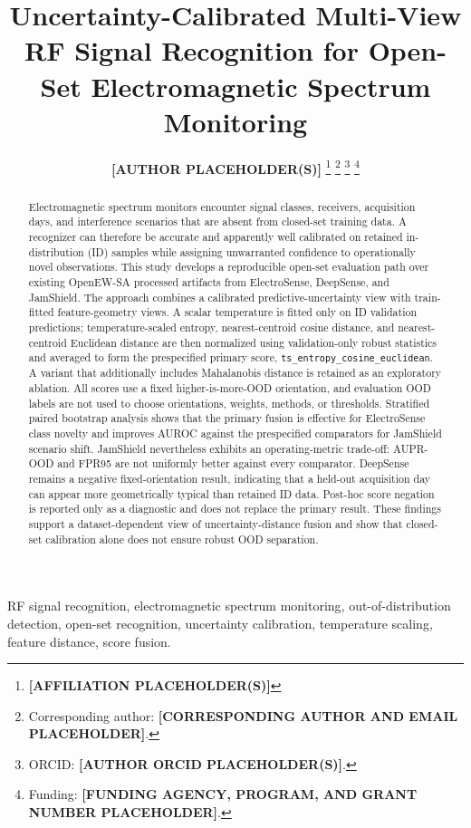 \documentclass[journal]{IEEEtran}
\title{Uncertainty-Calibrated Multi-View RF Signal Recognition for Open-Set Electromagnetic Spectrum Monitoring}
\author{%
  \textbf{[AUTHOR PLACEHOLDER(S)]}%
  \thanks{\textbf{[AFFILIATION PLACEHOLDER(S)]}}%
  \thanks{Corresponding author: \textbf{[CORRESPONDING AUTHOR AND EMAIL PLACEHOLDER]}.}%
  \thanks{ORCID: \textbf{[AUTHOR ORCID PLACEHOLDER(S)]}.}%
  \thanks{Funding: \textbf{[FUNDING AGENCY, PROGRAM, AND GRANT NUMBER PLACEHOLDER]}.}%
}
\newcommand{\primarymethod}{{\footnotesize\texttt{ts\_\allowbreak entropy\_\allowbreak cosine\_\allowbreak euclidean}}}
\begin{document}
\maketitle

\begin{abstract}
Electromagnetic spectrum monitors encounter signal classes, receivers, acquisition days, and interference scenarios that are absent from closed-set training data. A recognizer can therefore be accurate and apparently well calibrated on retained in-distribution (ID) samples while assigning unwarranted confidence to operationally novel observations. This study develops a reproducible open-set evaluation path over existing OpenEW-SA processed artifacts from ElectroSense, DeepSense, and JamShield. The approach combines a calibrated predictive-uncertainty view with train-fitted feature-geometry views. A scalar temperature is fitted only on ID validation predictions; temperature-scaled entropy, nearest-centroid cosine distance, and nearest-centroid Euclidean distance are then normalized using validation-only robust statistics and averaged to form the prespecified primary score, \primarymethod. A variant that additionally includes Mahalanobis distance is retained as an exploratory ablation. All scores use a fixed higher-is-more-OOD orientation, and evaluation OOD labels are not used to choose orientations, weights, methods, or thresholds. Stratified paired bootstrap analysis shows that the primary fusion is effective for ElectroSense class novelty and improves AUROC against the prespecified comparators for JamShield scenario shift. JamShield nevertheless exhibits an operating-metric trade-off: AUPR-OOD and FPR95 are not uniformly better against every comparator. DeepSense remains a negative fixed-orientation result, indicating that a held-out acquisition day can appear more geometrically typical than retained ID data. Post-hoc score negation is reported only as a diagnostic and does not replace the primary result. These findings support a dataset-dependent view of uncertainty-distance fusion and show that closed-set calibration alone does not ensure robust OOD separation.
\end{abstract}

\begin{IEEEkeywords}
RF signal recognition, electromagnetic spectrum monitoring, out-of-distribution detection, open-set recognition, uncertainty calibration, temperature scaling, feature distance, score fusion.
\end{IEEEkeywords}
\end{document}
